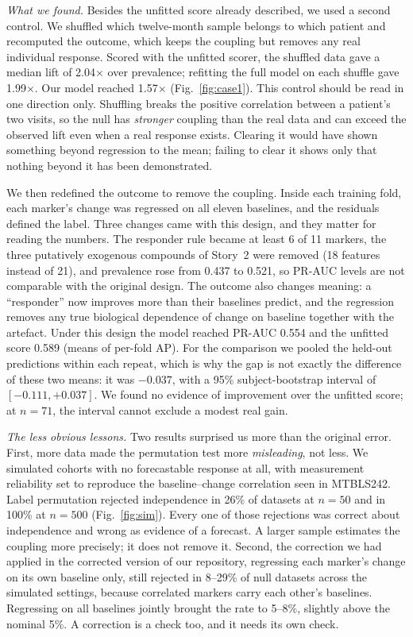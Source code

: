 \documentclass[conference]{IEEEtran}
\begin{document}
\emph{What we found.} Besides the unfitted score already described, we used a
second control. We shuffled which twelve-month sample belongs to which
patient and recomputed the outcome, which keeps the coupling but removes any
real individual response. Scored with the unfitted scorer, the shuffled data
gave a median lift of 2.04$\times$ over prevalence; refitting the full model
on each shuffle gave 1.99$\times$. Our model reached 1.57$\times$
(Fig.~\ref{fig:case1}). This control should be read in one direction only.
Shuffling breaks the positive correlation between a patient's two visits, so
the null has \emph{stronger} coupling than the real data and can exceed the
observed lift even when a real response exists. Clearing it would have
shown something beyond regression to the mean; failing to clear it shows
only that nothing beyond it has been demonstrated.

We then redefined the outcome to remove the coupling. Inside each training
fold, each marker's change was regressed on all eleven baselines, and the
residuals defined the label. Three changes came with this design, and they
matter for reading the numbers. The responder rule became at least 6 of 11
markers, the three putatively exogenous compounds of Story~2 were removed
(18 features instead of 21), and prevalence rose from 0.437 to 0.521, so
PR-AUC levels are not comparable with the original design. The outcome
also changes meaning: a ``responder'' now improves more than their baselines
predict, and the regression removes any true biological dependence of
change on baseline together with the artefact. Under this design the model
reached PR-AUC 0.554 and the unfitted score 0.589 (means of per-fold AP).
For the comparison we pooled the held-out predictions within each repeat,
which is why the gap is not exactly the difference of these two means: it
was $-0.037$, with a 95\% subject-bootstrap interval of $[-0.111, +0.037]$.
We found no evidence of improvement over the unfitted score; at $n=71$, the
interval cannot exclude a modest real gain.

\emph{The less obvious lessons.} Two results surprised us more than the
original error. First, more data made the permutation test more
\emph{misleading}, not less. We simulated cohorts with no forecastable
response at all, with measurement reliability set to reproduce the
baseline--change correlation seen in MTBLS242. Label permutation rejected
independence in 26\% of datasets at $n=50$ and in 100\% at $n=500$
(Fig.~\ref{fig:sim}). Every one of those rejections was correct about
independence and wrong as evidence of a forecast. A larger sample estimates
the coupling more precisely; it does not remove it. Second, the correction we
had applied in the corrected version of our repository, regressing each
marker's change on its own baseline only, still rejected in 8--29\% of null
datasets across the simulated settings, because correlated markers carry
each other's baselines. Regressing on all baselines jointly brought the rate
to 5--8\%, slightly above the nominal 5\%. A correction is a check too, and it
needs its own check.
\end{document}
